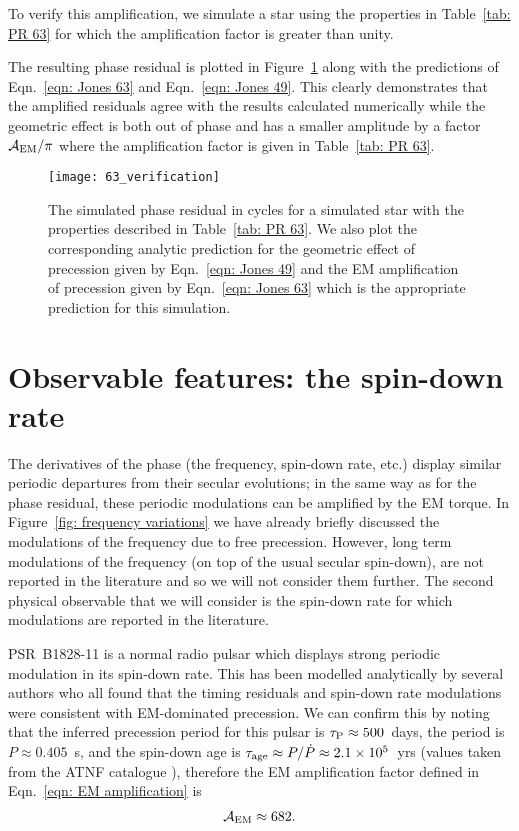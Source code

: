 \documentclass[../full_thesis/full_thesis.tex]{subfiles}
\newcommand{\thisdir}{../inertial_frame}
\begin{document}
To verify this amplification, we simulate a star using the properties in
Table~\ref{tab: PR 63} for which the amplification factor is greater than
unity.
\begin{table}[htb]
\centering

\caption{Simulation parameters used for the phase residual plotted in
Figure~\ref{fig: PR 63}.}
\label{tab: PR 63}
\end{table}
The resulting phase residual is plotted in Figure~\ref{fig: PR 63} along with the
predictions of Eqn.~\eqref{eqn: Jones 63} and Eqn.~\eqref{eqn: Jones 49}. This
clearly demonstrates that the amplified residuals agree with the results
calculated numerically while the geometric effect is both out of phase and
has a smaller amplitude by a factor $\mathcal{A}_{\mathrm{EM}}/\pi$ where the amplification factor is
given in Table~\ref{tab: PR 63}.
\begin{figure}[htb]
\centering
\texttt{[image: 63\_verification]}
\caption{The simulated phase residual in cycles for a simulated star with the
properties described in Table~\ref{tab: PR 63}. We also plot the corresponding
analytic prediction for the geometric effect of precession given by
 Eqn.~\eqref{eqn: Jones 49} and the EM amplification of precession given by
Eqn.~\eqref{eqn: Jones 63} which is the appropriate prediction for this simulation.}
\label{fig: PR 63}
\end{figure}

\section{Observable features: the spin-down rate}
\label{sec: observable features: spin-down rate}

The derivatives of the phase (the frequency, spin-down rate, etc.) display
similar periodic departures from their secular evolutions; in the same way as
for the phase residual, these periodic modulations can be amplified by the
EM torque. In Figure~\ref{fig: frequency variations} we have already briefly
discussed the modulations of the frequency due to free precession. However,
long term modulations of the frequency (on top of the usual secular spin-down),
are not reported in the literature and so we will not consider them further.
The second physical observable that we will consider is the spin-down rate
for which modulations are reported in the literature.

PSR~B1828-11 is a normal radio pulsar which displays strong periodic modulation
in its spin-down rate. This has been modelled analytically by several authors
\citep{Stairs2000, Jones2001, Link2001, Akgun2006} who all found that the timing
residuals and spin-down rate modulations were consistent with EM-dominated
precession. We can confirm this by noting that the inferred precession period for this
pulsar is $\tau_{\mathrm{P}} \approx 500$~days, the period is $P\approx0.405$~s, and
the spin-down age is $\tau_{\mathrm{age}} \approx P/\dot{P} \approx 2.1 \times10^{5}$~yrs (values
taken from the ATNF catalogue \citet{ATNF}), therefore the EM amplification factor
defined in Eqn.~\ref{eqn: EM amplification} is
\begin{align}
\mathcal{A}_{\mathrm{EM}} \approx 682.
\end{align}
\end{document}
